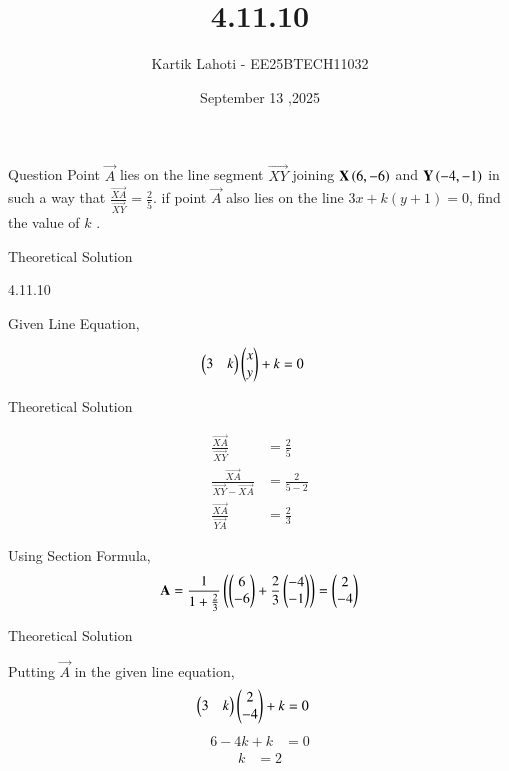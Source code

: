 \documentclass{beamer}
\title %
{4.11.10}
\date{September 13 ,2025}
\author 
{Kartik Lahoti - EE25BTECH11032}
\begin{document}
\frame{\titlepage}
\begin{frame}{Question}
Point $\vec{A}$ lies on the line segment $\vec{XY}$  joining $\mathbf{X}\left(6,-6\right)$ and $\mathbf{Y}\left(-4,-1\right)$ in such a way that $\frac{\vec{XA}}{\vec{XY}} = \frac{2}{5}$. if point $\vec{A}$ also lies on the line $3x + k(y+1) = 0$, find the value of $k$ .
\end{frame}

\begin{frame}{Theoretical Solution}

\begin{table}[H]
    \centering
    
    \caption{4.11.10}
    \label{tab:placeholder_1}
\end{table}

Given Line Equation, 

\begin{align}
        \begin{pmatrix}3 & k\end{pmatrix}\begin{pmatrix}x \\ y\end{pmatrix} + k &= 0  
\end{align}

\end{frame}
\begin{frame}{Theoretical Solution}

\begin{align}
    \frac{\vec{XA}}{\vec{XY}} &= \frac{2}{5}\\ 
    \frac{\vec{XA}}{\vec{XY}-\vec{XA}} &= \frac{2}{5-2} \\
    \frac{\vec{XA}}{\vec{YA}} &= \frac{2}{3} 
\end{align}

Using Section Formula, 
\begin{align}
  \mathbf{A} =  \frac{1}{1 + \frac{2}{3}}\left(\begin{pmatrix}6 \\ -6\end{pmatrix} + \frac{2}{3}\begin{pmatrix}-4\\-1\end{pmatrix}\right) = \begin{pmatrix}2 \\ -4\end{pmatrix}
\end{align}

\end{frame}
\begin{frame}{Theoretical Solution}

Putting $\vec{A}$ in the given line equation,
\begin{align}
  \begin{pmatrix}3 & k\end{pmatrix}\begin{pmatrix}2 \\ -4 \end{pmatrix} + k &= 0 
\end{align}
\begin{align}
    6 - 4k + k &= 0 
\end{align}
\begin{align}
    k &= 2
\end{align}
\end{frame}
\end{document}

